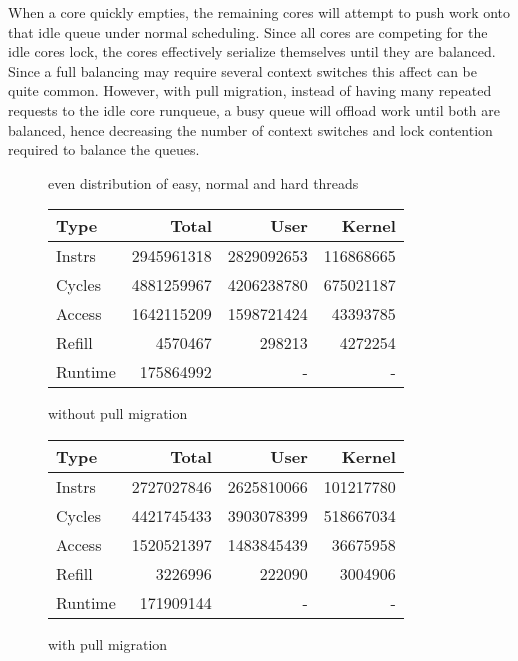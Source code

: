 \documentclass[11pt]{article}
\begin{document}
When a core quickly empties, the remaining cores will attempt to push work onto that idle queue under normal scheduling.  Since all cores are competing for the idle cores lock, the cores effectively serialize themselves until they are balanced.  Since a full balancing may require several context switches this affect can be quite common.  However, with pull migration, instead of having many repeated requests to the idle core runqueue, a busy queue will offload work until both are balanced, hence decreasing the number of context switches and lock contention required to balance the queues.

\begin{figure*}[!h]
	\caption{even distribution of easy, normal and hard threads}
	\centering
	\begin{subtable}[b]{.48\linewidth}
		\centering                 
		\begin{tabular}{ l|rrr }
			Type    & Total      & User       & Kernel    \\
			\hline
			Instrs  & 2945961318 & 2829092653 & 116868665 \\ 
			Cycles  & 4881259967 & 4206238780 & 675021187 \\ 
			Access  & 1642115209 & 1598721424 & 43393785  \\ 
			Refill  & 4570467    & 298213     & 4272254   \\ 
			Runtime & 175864992  & -          & -         \\
			\hline
		\end{tabular}
		\caption{without pull migration}    
	\end{subtable}
	\hfill
	\begin{subtable}[b]{.48\linewidth}
		\centering
		\begin{tabular}{ l|rrr }
			Type    & Total      & User       & Kernel    \\
			\hline
			Instrs  & 2727027846 & 2625810066 & 101217780 \\ 
			Cycles  & 4421745433 & 3903078399 & 518667034 \\ 
			Access  & 1520521397 & 1483845439 & 36675958  \\ 
			Refill  & 3226996    & 222090     & 3004906   \\ 
			Runtime & 171909144  & -          & -         \\
			\hline
		\end{tabular}
		\caption{with pull migration}
	\end{subtable}
\end{figure*}
\end{document}
